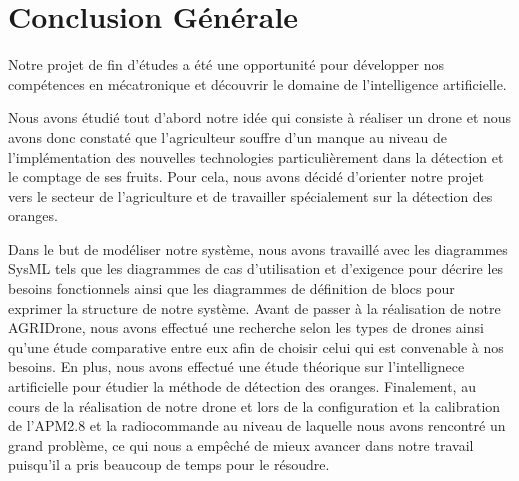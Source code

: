 \chapter*{Conclusion Générale }
Notre projet de fin d'études a été une opportunité pour développer nos compétences en mécatronique et découvrir le domaine de l'intelligence artificielle.


Nous avons étudié tout d'abord notre idée qui consiste à réaliser un drone et nous avons donc constaté que l'agriculteur souffre d'un manque au niveau de l'implémentation des nouvelles technologies particulièrement dans la détection et le comptage de ses fruits. Pour cela, nous avons décidé d'orienter notre projet vers le secteur de l'agriculture et de travailler spécialement sur la détection des oranges. 


Dans le but de modéliser notre système, nous avons travaillé avec les diagrammes SysML tels que les diagrammes de cas d'utilisation et d'exigence pour décrire les besoins fonctionnels ainsi que les diagrammes de définition de blocs pour exprimer la structure de notre système. Avant de passer à la réalisation de notre AGRIDrone, nous avons effectué une recherche selon les types de drones ainsi qu'une étude comparative entre eux afin de choisir celui qui est convenable à nos besoins. 
En plus, nous avons effectué une étude théorique sur l'intellignece artificielle pour étudier la méthode de détection des oranges. 
Finalement, au cours de la réalisation de notre drone et lors de la configuration et la calibration de l'APM2.8 et la radiocommande au niveau de laquelle nous avons rencontré un grand problème, ce qui nous a empêché de mieux avancer dans notre travail puisqu'il a pris beaucoup de temps pour le résoudre.
